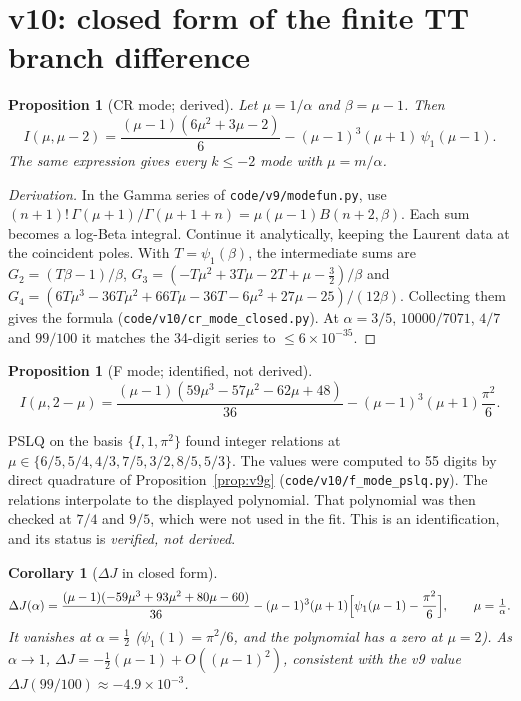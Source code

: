\documentclass[11pt,a4paper]{article}
\newcommand{\loc}[1]{\nolinkurl{#1}}
\theoremstyle{plain}
\newtheorem{proposition}[theorem]{Proposition}
\newtheorem{corollary}[theorem]{Corollary}
\theoremstyle{definition}
\theoremstyle{remark}
\numberwithin{equation}{section}
\begin{document}
\section{v10: closed form of the finite TT branch difference}
\label{sec:v10dJ}

\begin{proposition}[CR mode; derived]
\label{prop:v10ICR}
Let \(\mu=1/\alpha\) and \(\beta=\mu-1\). Then
\[
 I(\mu,\mu-2)=\frac{(\mu-1)(6\mu^2+3\mu-2)}6-(\mu-1)^3(\mu+1)\,\psi_1(\mu-1).
\]
The same expression gives every \(k\le-2\) mode with \(\mu=m/\alpha\).
\end{proposition}

\begin{proof}[Derivation]
In the Gamma series of \loc{code/v9/modefun.py}, use
\((n+1)!\,\Gamma(\mu+1)/\Gamma(\mu+1+n)=\mu(\mu-1)B(n+2,\beta)\).
Each sum becomes a log-Beta integral. Continue it analytically,
keeping the Laurent data at the coincident poles. With
\(T=\psi_1(\beta)\), the intermediate sums are
\(G_2=(T\beta-1)/\beta\),
\(G_3=(-T\mu^2+3T\mu-2T+\mu-\tfrac32)/\beta\) and
\(G_4=(6T\mu^3-36T\mu^2+66T\mu-36T-6\mu^2+27\mu-25)/(12\beta)\).
Collecting them gives the formula
(\loc{code/v10/cr_mode_closed.py}). At \(\alpha=3/5\),
\(10000/7071\), \(4/7\) and \(99/100\) it matches the 34-digit
series to \(\le6\times10^{-35}\).
\end{proof}

\begin{proposition}[F mode; identified, not derived]
\label{prop:v10IF}
\[
 I(\mu,2-\mu)=\frac{(\mu-1)(59\mu^3-57\mu^2-62\mu+48)}{36}-(\mu-1)^3(\mu+1)\frac{\pi^2}6 .
\]
\end{proposition}
PSLQ \cite{PSLQ} on the basis \(\{I,1,\pi^2\}\) found integer relations at
\(\mu\in\{6/5,5/4,4/3,7/5,3/2,8/5,5/3\}\). The values were computed
to 55 digits by direct quadrature of Proposition~\ref{prop:v9g}
(\loc{code/v10/f_mode_pslq.py}). The relations interpolate to the
displayed polynomial. That polynomial was then checked at \(7/4\)
and \(9/5\), which were not used in the fit.
This is an identification, and its status is \emph{verified, not
derived}.

\begin{corollary}[\(\Delta J\) in closed form]
\label{cor:v10dJ}
\[
 \Delta J(\alpha)=\frac{(\mu-1)(-59\mu^3+93\mu^2+80\mu-60)}{36}
 -(\mu-1)^3(\mu+1)\Bigl[\psi_1(\mu-1)-\frac{\pi^2}6\Bigr],\qquad \mu=\tfrac1\alpha .
\]
It vanishes at \(\alpha=\tfrac12\) (\(\psi_1(1)=\pi^2/6\), and the
polynomial has a zero at \(\mu=2\)). As \(\alpha\to1\),
\(\Delta J=-\tfrac12(\mu-1)+O((\mu-1)^2)\), consistent with the v9
value \(\Delta J(99/100)\approx-4.9\times10^{-3}\).
\end{corollary}
\end{document}
